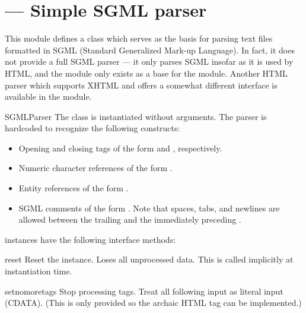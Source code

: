 \section{ ---
         Simple SGML parser}



This module defines a class  which serves as the
basis for parsing text files formatted in SGML (Standard Generalized
Mark-up Language).  In fact, it does not provide a full SGML parser
--- it only parses SGML insofar as it is used by HTML, and the module
only exists as a base for the  module.  Another
HTML parser which supports XHTML and offers a somewhat different
interface is available in the  module.


\begin{classdesc}{SGMLParser}{}
The  class is instantiated without arguments.
The parser is hardcoded to recognize the following
constructs:

\begin{itemize}
\item
Opening and closing tags of the form
 and
, respectively.

\item
Numeric character references of the form .

\item
Entity references of the form .

\item
SGML comments of the form .  Note that
spaces, tabs, and newlines are allowed between the trailing
\samp{>} and the immediately preceding \samp{--}.

\end{itemize}
\end{classdesc}

 instances have the following interface methods:


\begin{methoddesc}{reset}{}
Reset the instance.  Loses all unprocessed data.  This is called
implicitly at instantiation time.
\end{methoddesc}

\begin{methoddesc}{setnomoretags}{}
Stop processing tags.  Treat all following input as literal input
(CDATA).  (This is only provided so the archaic HTML tag
 can be implemented.)
\end{methoddesc}

